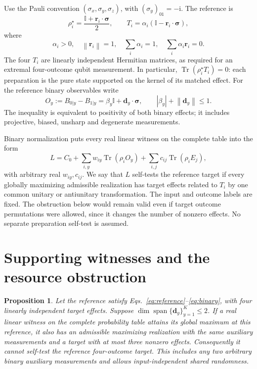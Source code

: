 \documentclass[11pt,a4paper]{article}
\newcommand{\id}{\mathbb{I}}
\newcommand{\tr}{\operatorname{Tr}}
\newcommand{\bs}{\boldsymbol{\sigma}}
\newcommand{\rv}{\mathbf{r}}
\newcommand{\dv}{\mathbf{d}}
\newcommand{\norm}[1]{\left\lVert#1\right\rVert}
\newtheorem{proposition}{Proposition}
\begin{document}
Use the Pauli convention $(\sigma_x,\sigma_y,\sigma_z)$, with
$(\sigma_y)_{01}=-\mathrm{i}$. The reference is
\begin{equation}
 \rho_i^\star=\frac{\id+\rv_i\cdot\bs}{2},\qquad
 T_i=\alpha_i(\id-\rv_i\cdot\bs),
 \label{eq:reference}
\end{equation}
where
\begin{equation}
 \alpha_i>0,\quad \norm{\rv_i}=1,\quad
 \sum_i\alpha_i=1,\quad \sum_i\alpha_i\rv_i=0.
 \label{eq:complete}
\end{equation}
The four $T_i$ are linearly independent Hermitian matrices, as required for
an extremal four-outcome qubit measurement. In particular,
$\tr(\rho_i^\star T_i)=0$: each preparation is the pure state supported on
the kernel of its matched effect. For the reference binary observables write
\begin{equation}
 O_y:=B_{0|y}-B_{1|y}=\beta_y\id+\dv_y\cdot\bs,
 \qquad |\beta_y|+\norm{\dv_y}\leq1.
 \label{eq:binary}
\end{equation}
The inequality is equivalent to positivity of both binary effects; it includes
projective, biased, unsharp and degenerate measurements.

Binary normalization puts every real linear witness on the complete table into
the form
\begin{equation}
 L=C_0+\sum_{i,y}w_{iy}\tr(\rho_iO_y)
       +\sum_{i,j}c_{ij}\tr(\rho_iE_j),
 \label{eq:witness}
\end{equation}
with arbitrary real $w_{iy},c_{ij}$. We say that $L$ self-tests the reference
target if every globally maximizing admissible realization has target effects
related to $T_i$ by one common unitary or antiunitary transformation. The input
and outcome labels are fixed. The obstruction below would remain valid even
if target outcome permutations were allowed, since it changes the number of
nonzero effects. No separate preparation self-test is assumed.

\section{Supporting witnesses and the resource obstruction}

\begin{proposition}
\label{prop:main}
Let the reference satisfy Eqs.~\eqref{eq:reference}--\eqref{eq:binary}, with
four linearly independent target effects. Suppose
$\dim\operatorname{span}\{\dv_y\}_{y=1}^K\leq2$.
If a real linear witness on the complete probability table attains its global
maximum at this reference, it also has an admissible maximizing realization
with the same auxiliary measurements and a target with at most three nonzero
effects. Consequently it cannot self-test the reference four-outcome target.
This includes any two arbitrary binary auxiliary measurements and allows
input-independent shared randomness.
\end{proposition}
\end{document}
